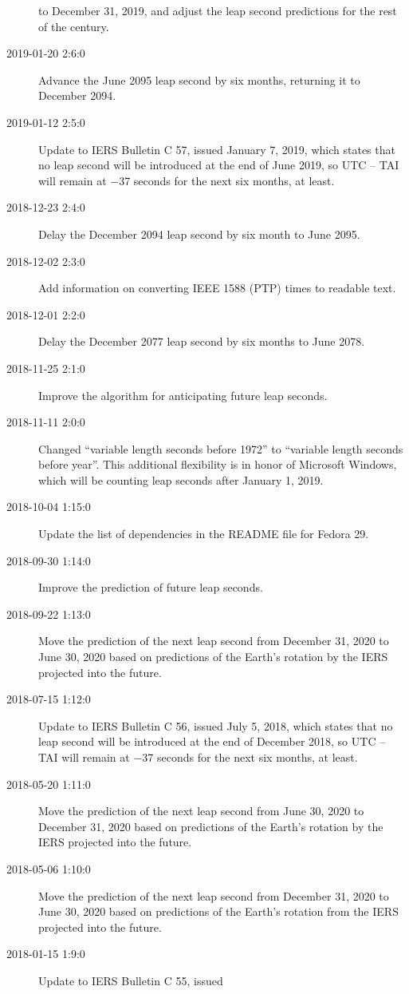 \documentclass[letterpaper,twoside]{article}
\begin{document}
\begin{description}
  to December 31, 2019, and adjust the leap second predictions
  for the rest of the century.
\item[2019-01-20 2:6:0] Advance the June 2095 leap second by six
  months, returning it to December 2094.
\item[2019-01-12 2:5:0] Update to IERS Bulletin C 57, issued January
  7, 2019, which states that no leap second will be introduced
  at the end of June 2019, so UTC -- TAI will remain at
  \num{-37} seconds for the next six months, at least.  
\item[2018-12-23 2:4:0] Delay the December 2094 leap second by six month
  to June 2095.
\item[2018-12-02 2:3:0] Add information on converting IEEE 1588 (PTP)
  times to readable text.
\item[2018-12-01 2:2:0] Delay the December 2077 leap second by
  six months to June 2078.
\item[2018-11-25 2:1:0] Improve the algorithm for anticipating future
  leap seconds.
\item[2018-11-11 2:0:0] Changed ``variable length seconds before 1972''
  to ``variable length seconds before year''.  This additional flexibility
  is in honor of Microsoft Windows, which will be counting leap seconds
  after January 1, 2019.
\item[2018-10-04 1:15:0] Update the list of dependencies in the
  README file for Fedora 29.
\item[2018-09-30 1:14:0] Improve the prediction of future leap seconds.
\item[2018-09-22 1:13:0] Move the prediction of the next leap second
  from December 31, 2020 to June 30, 2020 based on predictions of
  the Earth's rotation by the IERS projected into the future.
\item[2018-07-15 1:12:0] Update to IERS Bulletin C 56, issued July
  5, 2018, which states that no leap second will be introduced
  at the end of December 2018, so UTC -- TAI will remain at
  \num{-37} seconds for the next six months, at least.
\item[2018-05-20 1:11:0] Move the prediction of the next leap second
  from June 30, 2020 to December 31, 2020 based on predictions of
  the Earth's rotation by the IERS projected into the future.
\item[2018-05-06 1:10:0] Move the prediction of the next leap second
  from December 31, 2020 to June 30, 2020 based on predictions
  of the Earth's rotation from the IERS projected into the future.
\item[2018-01-15 1:9:0] Update to IERS Bulletin C 55, issued

\end{description}
\end{document}
